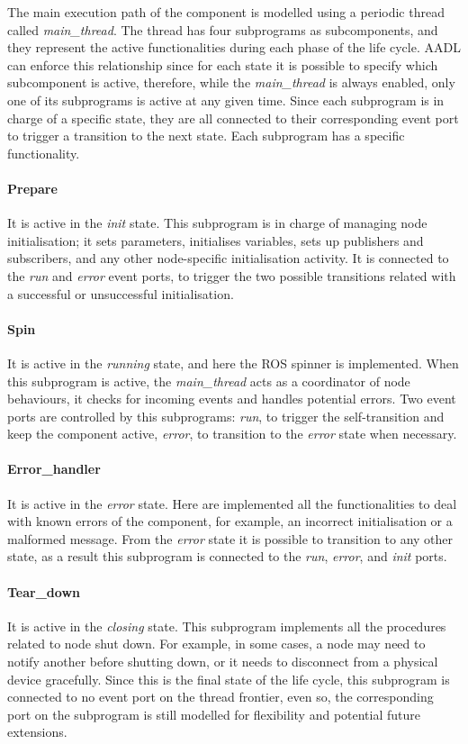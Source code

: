 The main execution path of the component is modelled using a periodic thread called \textit{main\_thread}. The thread has four subprograms as subcomponents, and they represent the active functionalities during each phase of the life cycle. AADL can enforce this relationship since for each state it is possible to specify which subcomponent is active, therefore, while the \textit{main\_thread} is always enabled, only one of its subprograms is active at any given time. Since each subprogram is in charge of a specific state, they are all connected to their corresponding event port to trigger a transition to the next state. Each subprogram has a specific functionality.

\paragraph{Prepare} It is active in the \textit{init} state. This subprogram is in charge of managing node initialisation; it sets parameters, initialises variables, sets up publishers and subscribers, and any other node-specific initialisation activity. It is connected to the \textit{run} and \textit{error} event ports, to trigger the two possible transitions related with a successful or unsuccessful initialisation.
\paragraph{Spin} It is active in the \textit{running} state, and here the ROS spinner is implemented. When this subprogram is active, the \textit{main\_thread} acts as a coordinator of node behaviours, it checks for incoming events and handles potential errors. Two event ports are controlled by this subprograms: \textit{run}, to trigger the self-transition and keep the component active, \textit{error}, to transition to the \textit{error} state when necessary.
\paragraph{Error\_handler} It is active in the \textit{error} state. Here are implemented all the functionalities to deal with known errors of the component, for example, an incorrect initialisation or a malformed message. From the \textit{error} state it is possible to transition to any other state, as a result this subprogram is connected to the \textit{run}, \textit{error}, and \textit{init} ports.
\paragraph{Tear\_down} It is active in the \textit{closing} state. This subprogram implements all the procedures related to node shut down. For example, in some cases, a node may need to notify another before shutting down, or it needs to disconnect from a physical device gracefully. Since this is the final state of the life cycle, this subprogram is connected to no event port on the thread frontier, even so, the corresponding port on the subprogram is still modelled for flexibility and potential future extensions.
\medskip


